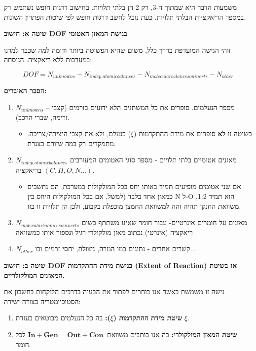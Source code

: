 \documentclass[
  hebrew,
  letterpaper,
  DIV=11,
  numbers=noendperiod]{scrreprt}
\providecommand{\tightlist}{%
  \setlength{\itemsep}{0pt}\setlength{\parskip}{0pt}}
\begin{document}
משמעות הדבר היא שמתוך ה-3, רק 2 הן בלתי תלויות. בחישוב דרגות חופש נשתמש
רק במספר הריאקציות הבלתי תלויות. כעת נוכל לחשב דרגות חופש לפי שיטות
הפתרון השונות.

\textbf{שיטה א\textquotesingle: חישוב DOF בגישת המאזן האטומי}

זוהי הגישה המועדפת בדרך כלל, משום שהיא הפשוטה ביותר ודומה למה שכבר למדנו
במערכות ללא ריאקציה. הנוסחה:

\[DOF = N_{unknowns} - N_{indep.atomicbalances} - N_{molecularbalancesoninerts} - N_{other}\]

\textbf{הסבר האיברים:}

\begin{enumerate}
\def\labelenumi{\arabic{enumi}.}
\item
  \(N_{unknowns}\) -- מספר הנעלמים. סופרים את כל המשתנים הלא ידועים
  בזרמים (קצבי זרימה, שברי הרכב).

  \begin{itemize}
  \tightlist
  \item
    בשיטה זו \textbf{לא} סופרים את מידת ההתקדמות (\(\xi\)) כנעלם, ולא את
    קצבי היצירה/צריכה. מתמקדים רק במה שזורם בצנרת.
  \end{itemize}
\item
  \(N_{indep.atomicbalances}\) מאזנים אטומיים בלתי תלויים - מספר סוגי
  האטומים המעורבים בריאקציה \((C,H,O,N\ldots)\).

  \begin{itemize}
  \tightlist
  \item
    אם שני אטומים מופיעים תמיד באותו יחס בכל המולקולות במערכת, הם נחשבים
    כמאזן אחד בלבד (למשל, אם בכל המולקולות היחס בין N ל-O הוא תמיד 1:2,
    משוואת החנקן תהיה זהה למשוואת החמצן מוכפלת בקבוע, ולכן הן תלויות זו
    בזו.
  \end{itemize}
\item
  \(N_{molecularbalancesoninerts}\) מאזנים על חומרים אינרטיים- עבור חומר
  שאינו משתתף בשום ריאקציה (אינרטי) נכתוב מאזן מולקולרי רגיל ונספור אותו
  כמשוואה
\item
  \(N_{other}\) קשרים אחרים - נתונים כמו המרה, ניצולת, יחסי זרמים
  וכו\textquotesingle...
\end{enumerate}

\textbf{שיטה ב\textquotesingle: חישוב DOF בגישת מידת ההתקדמות (Extent of
Reaction) או בשיטת המאזנים המולקולריים.}

גישה זו משמשת כאשר אנו בוחרים לפתור את הבעיה בדרכים הלוקחות בחשבון את
הסטוכיומטריה בצורה ישירה:

\begin{enumerate}
\def\labelenumi{\arabic{enumi}.}
\item
  \textbf{שיטת מידת ההתקדמות (}\(\xi\)\textbf{):} בה כל הנעלמים מבוטאים
  בעזרת \(\xi\)\emph{.}
\item
  \textbf{שיטת המאזן המולקולרי:} בה אנו כותבים משוואת
  \(\mathbf{In + Gen = Out + Con}\ \) לכל חומר.
\end{enumerate}
\end{document}
